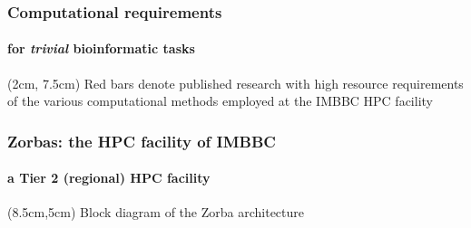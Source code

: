 \documentclass{beamer}
\begin{document}
   \begin{frame}

      \frametitle{Computational requirements}
      \framesubtitle{for \textit{trivial} bioinformatic tasks}


      \begin{textblock*}{10cm}(2cm, 7.5cm)
            \scriptsize Red bars denote published research with high resource requirements \\
            \scriptsize of the various computational methods employed at the IMBBC HPC facility
      \end{textblock*}


   \end{frame}

   \begin{frame}
   
      \frametitle{Zorbas: the HPC facility of IMBBC}
      \framesubtitle{a Tier 2 (regional) HPC facility}
      

      \begin{textblock*}{3.5cm}(8.5cm,5cm)
         Block diagram of the Zorba architecture
      \end{textblock*}
   
   \end{frame}
\end{document}
